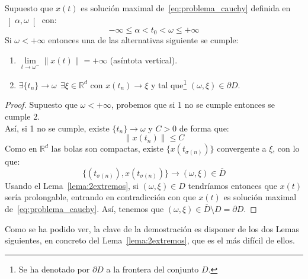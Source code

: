 \begin{teo}\label{teo:contiuacion_global}
    Supuesto que $x(t)$ es solución maximal de~\eqref{eq:problema_cauchy} definida en $\left]\alpha,\omega\right[$ con:
    \begin{equation*}
        -\infty \leq \alpha < t_0 < \omega \leq +\infty
    \end{equation*}
    Si $\omega<+\infty$ entonces una de las alternativas siguiente se cumple:
    \begin{enumerate}
        \item $\lim\limits_{t\to\omega^-} \|x(t)\|=+\infty $ (asíntota vertical).
        \item $\exists \{t_n\}\to \omega~~\exists \xi\in \mathbb{R}^d$ con $x(t_n)\to \xi$ y tal que\footnote{Se ha denotado por $\partial D$ a la frontera del conjunto $D$.} $(\omega,\xi)\in \partial  D$.
    \end{enumerate}
    \begin{proof}
        Supuesto que $\omega < +\infty$, probemos que si 1 no se cumple entonces se cumple 2.\\

        \noindent
        Así, si 1 no se cumple, existe $\{t_n\}\to \omega$ y $C>0$ de forma que:
        \begin{equation*}
            \|x(t_n)\| \leq C
        \end{equation*}
        Como en $\mathbb{R}^d$ las bolas son compactas, existe $\{x(t_{\sigma(n)})\}$ convergente a $\xi$, con lo que:
        \begin{equation*}
            \{(t_{\sigma(n)}), x(t_{\sigma(n)})\}\to (\omega, \xi) \in \overline{D}
        \end{equation*}
        Usando el Lema~\ref{lema:2extremos}, si $(\omega,\xi)\in D$  tendríamos entonces que $x(t)$ sería prolongable, entrando en contradicción con que $x(t)$ es solución maximal de~\eqref{eq:problema_cauchy}. Así, tenemos que $(\omega,\xi)\in \overline{D}\setminus D = \partial D$.
    \end{proof}
\end{teo}

\noindent
Como se ha podido ver, la clave de la demostración es disponer de los dos Lemas siguientes, en concreto del Lema~\ref{lema:2extremos}, que es el más difícil de ellos.


